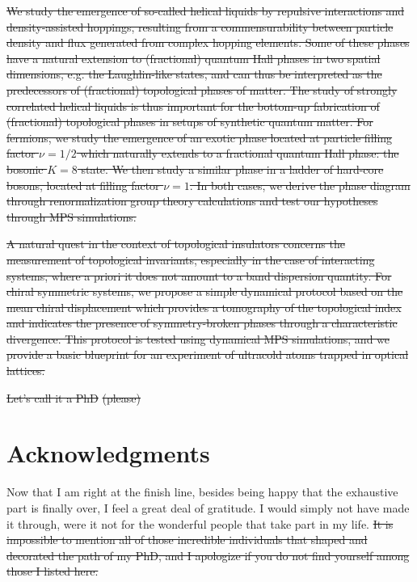 \documentclass{svmono}
\providecommand{\DIFdeltex}[1]{{\protect\color{red}\sout{#1}}}                      %
\providecommand{\DIFdelbegin}{} %
\providecommand{\DIFdelend}{} %
\providecommand{\DIFdel}[1]{\texorpdfstring{\DIFdeltex{#1}}{}} %
\newcommand{\DIFscaledelfig}{0.5}
\newlength{\DIFdelgraphicswidth} %
\newlength{\DIFdelgraphicsheight} %
\newcommand{\DIFdelincludegraphics}[2][]{%
\sbox{\DIFdelgraphicsbox}{\DIFOincludegraphics[#1]{#2}}%
\settoboxwidth{\DIFdelgraphicswidth}{\DIFdelgraphicsbox} %
\settoboxtotalheight{\DIFdelgraphicsheight}{\DIFdelgraphicsbox} %
\scalebox{\DIFscaledelfig}{%
\parbox[b]{\DIFdelgraphicswidth}{\usebox{\DIFdelgraphicsbox}\\[-\baselineskip] \rule{\DIFdelgraphicswidth}{0em}}\llap{\resizebox{\DIFdelgraphicswidth}{\DIFdelgraphicsheight}{%
\setlength{\unitlength}{\DIFdelgraphicswidth}%
\begin{picture}(1,1)%
\thicklines\linethickness{2pt} %
{\color[rgb]{1,0,0}\put(0,0){\framebox(1,1){}}}%
{\color[rgb]{1,0,0}\put(0,0){\line( 1,1){1}}}%
{\color[rgb]{1,0,0}\put(0,1){\line(1,-1){1}}}%
\end{picture}%
}\hspace*{3pt}}} %
} %
\DeclareRobustCommand{\DIFdelbegin}{\DIFOdelbegin \let\includegraphics\DIFdelincludegraphics} %
\DeclareRobustCommand{\DIFdelend}{\DIFOaddend \let\includegraphics\DIFOincludegraphics} %
\begin{document}
\DIFdel{We study the emergence of so-called helical liquids by repulsive interactions and density-assisted hoppings, resulting from a commensurability between particle density and flux generated from complex hopping elements.
Some of these phases have a natural extension to (fractional) quantum Hall phases in two spatial dimensions, e.g. the Laughlin-like states, and can thus be interpreted as the predecessors of (fractional) topological phases of matter.
The study of strongly correlated helical liquids is thus important for the bottom-up fabrication of (fractional) topological phases in setups of synthetic quantum matter.
For fermions, we study the emergence of an exotic phase located at particle filling factor $\nu=1/2$ which naturally extends to a fractional quantum Hall phase: the bosonic $K=8$ state.
We then study a similar phase in a ladder of hard-core bosons, located at filling factor $\nu=1$.
In both cases, we derive the phase diagram through renormalization group theory calculations and test our hypotheses through MPS simulations.
}%

\DIFdel{A natural quest in the context of topological insulators concerns the measurement of topological invariants, especially in the case of interacting systems, where a priori it does not amount to a band dispersion quantity.
For chiral symmetric systems, we propose a simple dynamical protocol based on the mean chiral displacement which provides a tomography of the topological index and indicates the presence of symmetry-broken phases through a characteristic divergence.
This protocol is tested using dynamical MPS simulations, and we provide a basic blueprint for an experiment of ultracold atoms trapped in optical lattices.
}%

\DIFdel{Let's call it a PhD }%
\DIFdel{(please)}%
\DIFdelend \chapter*{Acknowledgments}
Now that I am right at the finish line, besides being happy that the exhaustive part is finally over, I feel a great deal of gratitude.
I would simply not have made it through, were it not for the wonderful people that take part in my life.
\DIFdelbegin \DIFdel{It is impossible to mention all of those incredible individuals that shaped and decorated the path of my PhD, and I apologize if you do not find yourself among those I listed here.
}\DIFdelend 
\end{document}
